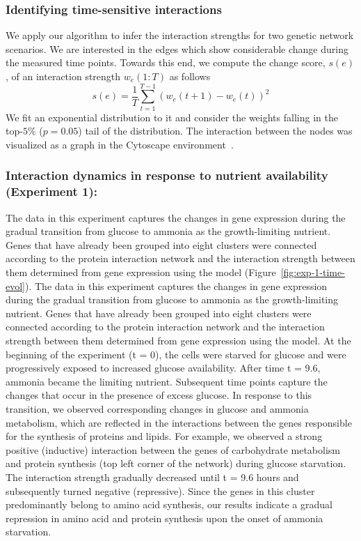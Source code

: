 \documentclass{bioinfo}
\begin{document}
\subsubsection{Identifying time-sensitive interactions}
\label{sec:ident-crit-inter}
 We apply our algorithm to infer the interaction strengths for two
genetic network scenarios. We are interested in the edges which show
considerable change during the measured time points. Towards this end,
we compute the change score, $s(e)$, of an interaction strength $w_{e}(1:T)$ as follows
\begin{equation}
  \label{eq:change-score}
  s(e) = \frac{1}{T} \sum_{t=1}^{T-1} (w_{e}(t+1) - w_{e}(t))^{2} 
\end{equation}
We fit an exponential distribution to it and consider the weights
falling in the top-$5 \%$ ($p=0.05$) tail of the
distribution. The interaction between the nodes was visualized as a
graph in the Cytoscape environment~\citep{Shannon2003}.

\subsubsection{Interaction dynamics in response to nutrient availability (Experiment 1):}
\label{sec:experiment-1}
The data in this experiment captures the changes in gene expression
during the gradual transition from glucose to ammonia as the
growth-limiting nutrient. Genes that have already been grouped into
eight clusters \citep{Farzadfard2010} were connected according to the
protein interaction network and the interaction strength between them
determined from gene expression using the model
(Figure~\ref{fig:exp-1-time-evol}).  The data in this experiment
captures the changes in gene expression during the gradual transition
from glucose to ammonia as the growth-limiting nutrient. Genes that
have already been grouped into eight clusters \citep{Farzadfard2010}
were connected according to the protein interaction network and the
interaction strength between them determined from gene expression
using the model. At the beginning of the experiment (t = 0), the cells
were starved for glucose and were progressively exposed to increased
glucose availability. After time t = 9.6, ammonia became the limiting
nutrient. Subsequent time points capture the changes that occur in the
presence of excess glucose. In response to this transition, we
observed corresponding changes in glucose and ammonia metabolism,
which are reflected in the interactions between the genes responsible
for the synthesis of proteins and lipids. For example, we observed a
strong positive (inductive) interaction between the genes of
carbohydrate metabolism and protein synthesis (top left corner of the
network) during glucose starvation. The interaction strength gradually
decreased until t = 9.6 hours and subsequently turned negative
(repressive). Since the genes in this cluster predominantly belong to
amino acid synthesis, our results indicate a gradual repression in
amino acid and protein synthesis upon the onset of ammonia starvation.
\end{document}
